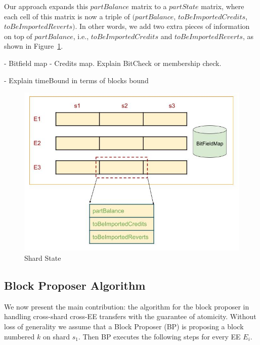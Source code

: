 \documentclass{article}
\begin{document}
Our approach expands this $partBalance$ matrix to a $partState$ matrix, where each cell of this matrix is now a triple of $(partBalance$, $toBeImportedCredits$, $toBeImportedReverts)$. In other words, we add two extra pieces of information on top of $partBalance$, i.e., $toBeImportedCredits$ and $toBeImportedReverts$, as shown in Figure~\ref{fig:shardstate}.

- Bitfield map - Credits map. Explain BitCheck or membership check.
  
- Explain timeBound in terms of blocks bound

\begin{figure}[h]
\includegraphics[scale=0.5]{state.jpg}
\caption{Shard State\label{fig:shardstate}}
\end{figure}

\subsection{Block Proposer Algorithm}
We now present the main contribution: the algorithm for the block proposer in handling cross-shard cross-EE transfers with the guarantee of atomicity. Without loss of generality we assume that a Block Proposer (BP) is proposing a block numbered $k$ on shard $s_1$. Then BP executes the following steps for every EE $E_i$. 
\end{document}
